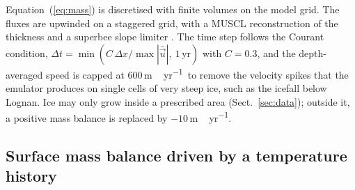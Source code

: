 \documentclass[tc, manuscript]{copernicus}
\newcommand{\myr}{\unit{m\,yr^{-1}}}
\newcommand{\ubar}{\bar{\vec{u}}}
\begin{document}
Equation~(\ref{eq:mass}) is discretised with finite volumes on the model grid. The fluxes are upwinded on a staggered grid, with a MUSCL reconstruction of the thickness and a superbee slope limiter \citep{vanleer1979,roe1986}. The time step follows the Courant condition, $\Delta t=\min(C\,\Delta x/\max|\ubar|,\ 1\,\mathrm{yr})$ with $C=0.3$, and the depth-averaged speed is capped at 600\,\myr\ to remove the velocity spikes that the emulator produces on single cells of very steep ice, such as the icefall below Lognan. Ice may only grow inside a prescribed area (Sect.~\ref{sec:data}); outside it, a positive mass balance is replaced by $-10$\,\myr.


\subsection{Surface mass balance driven by a temperature history}
\label{sec:smb}
\end{document}
